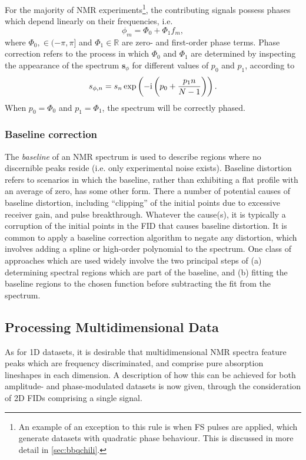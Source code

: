 For the majority of \ac{NMR} experiments\footnote{
     An example of an exception to this rule is when \acl{FS} pulses are applied,
     which generate datasets with quadratic phase behaviour. This is discussed
     in more detail in \cref{sec:bbqchili}.
}, the contributing signals possess phases which depend linearly on their
frequencies, i.e.
\begin{equation}
    \phi_m = \Phi_0 + \Phi_1 f_m,
\end{equation}
where $\Phi_0, \in (-\pi, \pi]$ and $\Phi_1 \in \mathbb{R}$ are zero- and
first-order phase terms.
Phase correction refers to the process in which $\Phi_0$ and $\Phi_1$ are
determined by inspecting the appearance of the spectrum
$\symbf{s}_{\phi}$ for different values of $p_0$ and  $p_1$, according to
\begin{equation}
    s_{\phi,n} = s_n
    \exp\left(-\mathrm{i} \left(p_0 + \frac{p_1 n}{N - 1}\right)\right).
\end{equation}
When $p_0 = \Phi_0$ and  $p_1 = \Phi_1$, the spectrum will be correctly phased.

\subsubsection{Baseline correction}
The \emph{baseline} of an \ac{NMR} spectrum is used to describe regions where
no discernible peaks reside (i.e. only experimental noise exists).
Baseline distortion refers to scenarios in which the baseline, rather
than exhibiting a flat profile with an average of zero, has some other form.
There a number of potential causes of baseline distortion, including
``clipping'' of the initial points due to excessive receiver gain,
and pulse breakthrough.
Whatever the cause(s), it is typically a corruption of the initial points in
the \ac{FID} that causes baseline distortion.
It is common to apply a baseline correction algorithm to negate any distortion,
which involves adding a spline or high-order polynomial to the spectrum.
One class of approaches which are used widely involve the two principal steps
of (a) determining spectral regions which are part of the baseline, and (b)
fitting the baseline regions to the chosen
function before subtracting the fit from the
spectrum\cite{Dietrich1991,Cobas2006}.

\subsection{Processing Multidimensional Data}
\label{subsec:multidim}
As for \ac{1D} datasets, it is desirable that multidimensional \ac{NMR} spectra
feature peaks which are frequency discriminated, and comprise pure
absorption lineshapes in each dimension.
A description of how this can be achieved for both amplitude- and
phase-modulated datasets is now given, through the consideration of \ac{2D}
\acp{FID} comprising a single signal.

